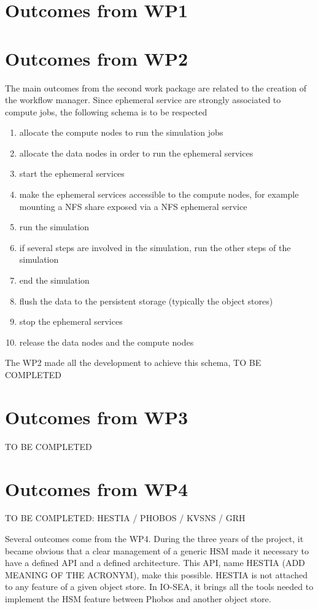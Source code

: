 \section{Outcomes from WP1}

\section{Outcomes from WP2}

The main outcomes from the second work package are related to the creation of the workflow manager. Since
ephemeral service are strongly associated to compute jobs, the following schema is to be respected
\begin{enumerate}
    \item allocate the compute nodes to run the simulation jobs
    \item allocate the data nodes in order to run the ephemeral services
    \item start the ephemeral services
    \item make the ephemeral services accessible to the compute nodes, for example mounting a NFS share
    exposed via a NFS ephemeral service
    \item run the simulation
    \item if several steps are involved in the simulation, run the other steps of the simulation
    \item end the simulation
    \item flush the data to the persistent storage (typically the object stores)
    \item stop the ephemeral services
    \item release the data nodes and the compute nodes
\end{enumerate}

The WP2 made all the development to achieve this schema, TO BE COMPLETED

\section{Outcomes from WP3}

TO BE COMPLETED

\section{Outcomes from WP4}

TO BE COMPLETED: HESTIA / PHOBOS / KVSNS / GRH

Several outcomes come from the WP4. During the three years of the project, it became obvious that a clear 
management of a generic HSM made it necessary to have a defined API and a defined architecture. This API, name HESTIA (ADD MEANING OF THE ACRONYM), make this possible. HESTIA is not attached to any feature of a given object 
store. In IO-SEA, it brings all the tools needed to implement the HSM feature between Phobos and another object
store.

